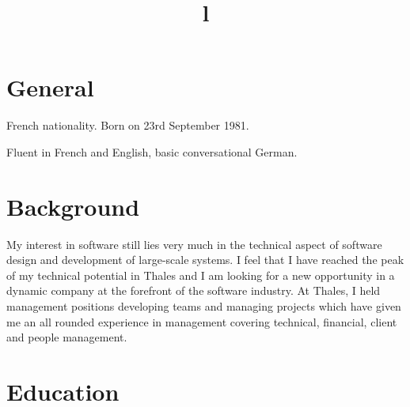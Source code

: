 \documentclass[overlapped,line,letterpaper]{res}
\begin{document}
\begin{resume}


  \section{\bf General}
  French nationality. Born on 23rd September 1981.

  Fluent in French and English, basic conversational German.


  \section{\bf Background}

  My interest in software still lies very much in the technical aspect of
  software design and development of large-scale systems. I feel that I
  have reached the peak of my technical potential in Thales and I am looking for
  a new opportunity in a dynamic company at the forefront of the software
  industry. At Thales, I held management positions developing teams and
  managing projects which have given me an all rounded experience in
  management covering technical, financial, client and people management.



  \section{\bf Education}

  \begin{format}
    \title{l}\\
    \body\\
  \end{format}


\end{resume}
\end{document}
